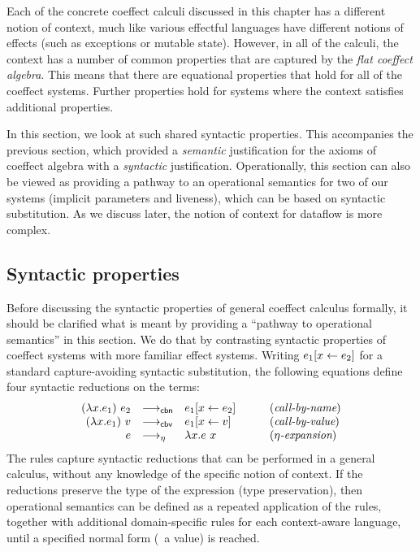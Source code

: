 Each of the concrete coeffect calculi discussed in this chapter has a different notion of context,
much like various effectful languages have different notions of effects (such as exceptions or
mutable state). However, in all of the calculi, the context has a number of common properties that
are captured by the \emph{flat coeffect algebra}. This means that there are equational properties
that hold for all of the coeffect systems. Further properties hold for systems where the context
satisfies additional properties.

In this section, we look at such shared syntactic properties. This accompanies the previous section,
which provided a \emph{semantic} justification for the axioms of coeffect algebra with a
\emph{syntactic} justification. Operationally, this section can also be viewed as providing a
pathway to an operational semantics for two of our systems (implicit parameters and liveness),
which can be based on syntactic substitution. As we discuss later, the notion of context for
dataflow is more complex.


\subsection{Syntactic properties}
\label{sec:flat-syntax-props}

Before discussing the syntactic properties of general coeffect calculus formally, it should be
clarified what is meant by providing a ``pathway to operational semantics'' in this section. We do
that by contrasting syntactic properties of coeffect systems with more familiar effect systems.
Writing $e_1[x \leftarrow e_2]$ for a standard capture-avoiding syntactic substitution, the following
equations define four syntactic reductions on the terms:
%
\begin{equation*}
\begin{array}{rllcl}
(\lambda x.e_1)~e_2 &{\longrightarrow_{\textnormal{\sffamily cbn}}}& e_1[x \leftarrow e_2]   &&(\textit{call-by-name})\\
(\lambda x.e_1)~v   &{\longrightarrow_{\textnormal{\sffamily cbv}}}& e_1[x \leftarrow v]     &\quad&(\textit{call-by-value})\\
e &{\longrightarrow_\eta}& \lambda x.e~x                                    &&(\textit{$\eta$-expansion})
\end{array}
\end{equation*}
%
The rules capture syntactic reductions that can be performed in a general calculus, without any
knowledge of the specific notion of context. If the reductions preserve the type of the expression
(type preservation), then operational semantics can be defined as a repeated application of the
rules, together with additional domain-specific rules for each context-aware language, until
a specified normal form (\ie~a value) is reached.

